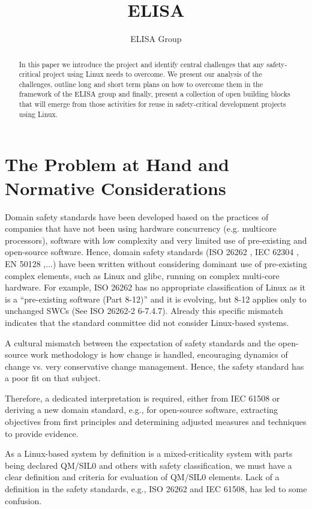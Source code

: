 \documentclass[12pt]{ElisaPaper}
\title{ELISA}
\author{ELISA Group}
\begin{document}
	
\maketitle	
\begin{abstract}
In this paper we introduce the project and identify central challenges that any safety-critical project using Linux needs to overcome.
We present our analysis of the challenges, outline long and short term plans on how to overcome them in the framework of the ELISA group and finally, present a collection of open building blocks that will emerge from those activities for reuse in safety-critical development projects using Linux.
\end{abstract}

\tableofcontents

\section{The Problem at Hand and Normative Considerations}
Domain safety standards have been developed based on the practices of companies that have not been using hardware concurrency (e.g. multicore processors), software with low complexity and very limited use of pre-existing and open-source software. 
Hence, domain safety standards (ISO 26262 \cite{ISO26262:2018}, IEC 62304 \cite{IEC62304}, EN 50128 \cite{DINEN50128},...) have been written without considering dominant use of pre-existing complex elements, such as Linux and glibc, running on complex multi-core hardware. 
For example, ISO 26262 has no appropriate classification of Linux as it is a “pre-existing software  (Part 8-12)” and it is evolving, but 8-12 applies only to unchanged SWCs (See ISO 26262-2 6-7.4.7). 
Already this specific mismatch indicates that the standard committee did not consider Linux-based systems.

A cultural mismatch between the expectation of safety standards and the open-source work methodology is how change is handled, encouraging dynamics of change vs. very conservative change management.
Hence, the safety standard has a poor fit on that subject.

Therefore, a dedicated interpretation is required, either from IEC 61508 or deriving a new domain standard, e.g., for open-source software, extracting objectives from first principles and determining adjusted measures and techniques to provide evidence.

As a Linux-based system by definition is a mixed-criticality system with parts being declared QM/SIL0 and others with safety classification, we must have a clear definition and criteria for evaluation of QM/SIL0 elements.
Lack of a definition in the safety standards, e.g., ISO 26262 and IEC 61508, has led to some confusion.
\end{document}
